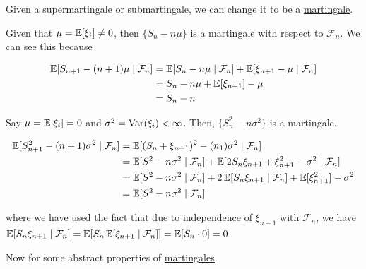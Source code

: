   Given a supermartingale or submartingale, we can change it to be a \hyperref[def:martingale]{martingale}. 

  \begin{example}
    \label{ex:centred-random-walk-as-a-martingale}
		Given that $\mu = \operatorname{\mathbb{E}}[\xi_i] \neq 0$, then $\{S_n - n\mu\}$ is a martingale with respect to $\mathcal{F}_n$. We can see this because

		\begin{align}
			\operatorname{\mathbb{E}}[S_{n+1} - (n + 1)\mu \mid \mathcal{F}_n] & = \operatorname{\mathbb{E}}[S_n - n \mu \mid \mathcal{F}_n] + \operatorname{\mathbb{E}}[\xi_{n+1} - \mu \mid \mathcal{F}_n] \\
			& = S_n - n \mu + \operatorname{\mathbb{E}}[\xi_{n+1}] - \mu \\
			& = S_n - n
		\end{align}
  \end{example}

  \begin{example}
    \label{ex:quadratic-martingale}
		Say $\mu = \operatorname{\mathbb{E}}[\xi_i] = 0$ and $\sigma^2 = \operatorname{Var}(\xi_i) < \infty$. Then, $\{S_n^2 - n \sigma^2\}$ is a martingale. 

		\begin{align}
			\operatorname{\mathbb{E}}[S_{n+1}^2 - (n + 1) \sigma^2 \mid \mathcal{F}_n] & = \operatorname{\mathbb{E}}[ (S_n + \xi_{n+1})^2 - (n _ 1) \sigma^2 \mid \mathcal{F}_n] \\
			& = \operatorname{\mathbb{E}}[S^2 - n \sigma^2 \mid \mathcal{F}_n ] + \operatorname{\mathbb{E}}[ 2 S_n \xi_{n+1} + \xi_{n+1}^2 - \sigma^2 \mid \mathcal{F}_n] \\
			& = \operatorname{\mathbb{E}}[S^2 - n \sigma^2 \mid \mathcal{F}_n ] + 2 \operatorname{\mathbb{E}}[ S_n \xi_{n+1} \mid \mathcal{F}_n ] + \operatorname{\mathbb{E}}[\xi_{n+1}^2] - \sigma^2  \\
			& = \operatorname{\mathbb{E}}[S^2 - n \sigma^2 \mid \mathcal{F}_n ]
		\end{align}

		where we have used the fact that due to independence of $\xi_{n+1}$ with $\mathcal{F}_n$, we have $\operatorname{\mathbb{E}}[S_n \xi_{n+1} \mid \mathcal{F}_n] = \operatorname{\mathbb{E}}[S_n \operatorname{\mathbb{E}}[ \xi_{n+1} \mid \mathcal{F}_n]] = \operatorname{\mathbb{E}}[S_n \cdot 0] = 0$. 
	\end{example}

	Now for some abstract properties of \hyperref[def:martingale]{martingales}. 

